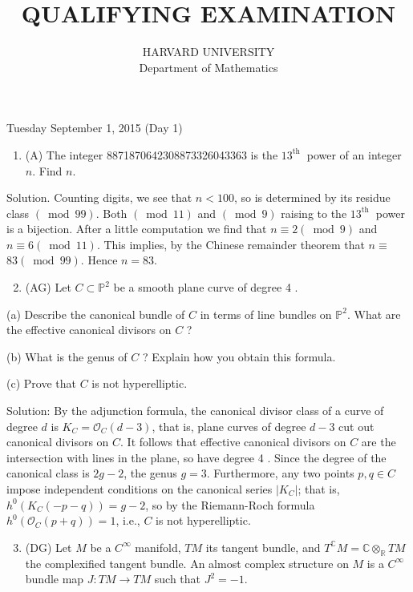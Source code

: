\documentclass[10pt]{article}
\title{QUALIFYING EXAMINATION }
\author{HARVARD UNIVERSITY\\
Department of Mathematics}
\date{}
\begin{document}
\maketitle
Tuesday September 1, 2015 (Day 1)

\begin{enumerate}
  \item (A) The integer 8871870642308873326043363 is the $13^{\text {th }}$ power of an integer $n$. Find $n$.
\end{enumerate}

Solution. Counting digits, we see that $n<100$, so is determined by its residue class $(\bmod 99)$. Both $(\bmod 11)$ and $(\bmod 9)$ raising to the $13^{\text {th }}$ power is a bijection. After a little computation we find that $n \equiv 2(\bmod 9)$ and $n \equiv 6(\bmod 11)$. This implies, by the Chinese remainder theorem that $n \equiv$ $83(\bmod 99)$. Hence $n=83$.

\begin{enumerate}
  \setcounter{enumi}{1}
  \item (AG) Let $C \subset \mathbb{P}^{2}$ be a smooth plane curve of degree 4 .
\end{enumerate}

(a) Describe the canonical bundle of $C$ in terms of line bundles on $\mathbb{P}^{2}$. What are the effective canonical divisors on $C$ ?

(b) What is the genus of $C$ ? Explain how you obtain this formula.

(c) Prove that $C$ is not hyperelliptic.

Solution: By the adjunction formula, the canonical divisor class of a curve of degree $d$ is $K_{C}=\mathcal{O}_{C}(d-3)$, that is, plane curves of degree $d-3$ cut out canonical divisors on $C$. It follows that effective canonical divisors on $C$ are the intersection with lines in the plane, so have degree 4 . Since the degree of the canonical class is $2 g-2$, the genus $g=3$. Furthermore, any two points $p, q \in C$ impose independent conditions on the canonical series $\left|K_{C}\right|$; that is, $h^{0}\left(K_{C}(-p-q)\right)=g-2$, so by the Riemann-Roch formula $h^{0}\left(\mathcal{O}_{C}(p+q)\right)=1$, i.e., $C$ is not hyperelliptic.

\begin{enumerate}
  \setcounter{enumi}{2}
  \item (DG) Let $M$ be a $C^{\infty}$ manifold, $T M$ its tangent bundle, and $T^{\mathbb{C}} M=\mathbb{C} \otimes_{\mathbb{R}} T M$ the complexified tangent bundle. An almost complex structure on $M$ is a $C^{\infty}$ bundle map $J: T M \rightarrow T M$ such that $J^{2}=-1$.
\end{enumerate}
\end{document}
